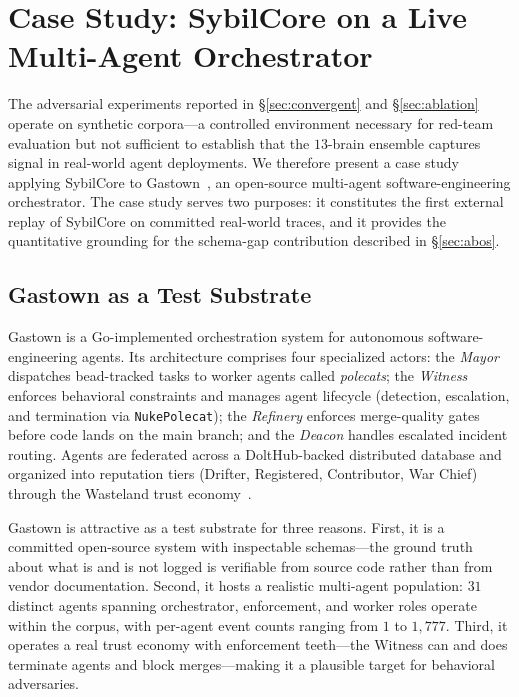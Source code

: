 %
%

\section{Case Study: SybilCore on a Live Multi-Agent Orchestrator}
\label{sec:gastown}

The adversarial experiments reported in \S\ref{sec:convergent} and
\S\ref{sec:ablation} operate on synthetic corpora---a controlled
environment necessary for red-team evaluation but not sufficient to
establish that the $13$-brain ensemble captures signal in real-world
agent deployments. We therefore present a case study applying SybilCore
to Gastown~\cite{gastown2026}, an open-source multi-agent
software-engineering orchestrator. The case study serves two purposes:
it constitutes the first external replay of SybilCore on committed
real-world traces, and it provides the quantitative grounding for the
schema-gap contribution described in \S\ref{sec:abos}.

\subsection{Gastown as a Test Substrate}
\label{sec:gastown:substrate}

Gastown is a Go-implemented orchestration system for autonomous
software-engineering agents. Its architecture comprises four specialized
actors: the \emph{Mayor} dispatches bead-tracked tasks to worker agents
called \emph{polecats}; the \emph{Witness} enforces behavioral
constraints and manages agent lifecycle (detection, escalation, and
termination via \texttt{NukePolecat}); the \emph{Refinery} enforces
merge-quality gates before code lands on the main branch; and the
\emph{Deacon} handles escalated incident routing. Agents are federated
across a DoltHub-backed distributed database and organized into
reputation tiers (Drifter, Registered, Contributor, War Chief) through
the Wasteland trust economy~\cite{gastown2026}.

Gastown is attractive as a test substrate for three reasons. First, it is
a committed open-source system with inspectable schemas---the ground truth
about what is and is not logged is verifiable from source code rather than
from vendor documentation. Second, it hosts a realistic multi-agent
population: $31$ distinct agents spanning orchestrator, enforcement, and
worker roles operate within the corpus, with per-agent event counts
ranging from $1$ to $1{,}777$. Third, it operates a real trust economy
with enforcement teeth---the Witness can and does terminate agents and
block merges---making it a plausible target for behavioral adversaries.

